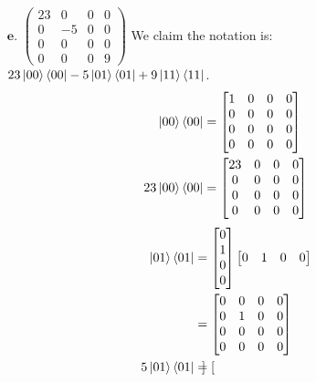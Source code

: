 \documentclass[11pt]{article}
\begin{document}
\begin{enumerate}
    \item[$\textbf{e.}$]
        $\begin{pmatrix}
            23 & 0 & 0 & 0 \\ 
            0 & -5 & 0 & 0 \\
            0 & 0 & 0 & 0 \\
            0 & 0 & 0 & 9
        \end{pmatrix}$
    We claim the notation is: 
    $23\ket{00}\bra{00} - 5\ket{01}\bra{01} + 9\ket{11}\bra{11}$. 
    \begin{align*}
        \ket{00}\bra{00} &= 
        \begin{bmatrix}
            1 & 0 & 0 & 0 \\
            0 & 0 & 0 & 0 \\
            0 & 0 & 0 & 0 \\
            0 & 0 & 0 & 0 \\
        \end{bmatrix}\\
        23\ket{00}\bra{00} &= 
        \begin{bmatrix}
            23 & 0 & 0 & 0 \\
            0 & 0 & 0 & 0 \\
            0 & 0 & 0 & 0 \\
            0 & 0 & 0 & 0 \\
        \end{bmatrix}\\
    \end{align*}
    \begin{align*}
        \ket{01}\bra{01} &= 
        \begin{bmatrix}
        0 \\ 1 \\ 0 \\ 0
        \end{bmatrix}
        \begin{bmatrix}
            0 & 1 & 0 & 0
        \end{bmatrix} \\
        &= \begin{bmatrix}
            0 & 0 & 0 & 0 \\
            0 & 1 & 0 & 0 \\
            0 & 0 & 0 & 0 \\
            0 & 0 & 0 & 0 \\
        \end{bmatrix} \\
        5\ket{01}\bra{01} &= \begin{bmatrix}

\end{bmatrix}
\end{align*}
\end{enumerate}
\end{document}

